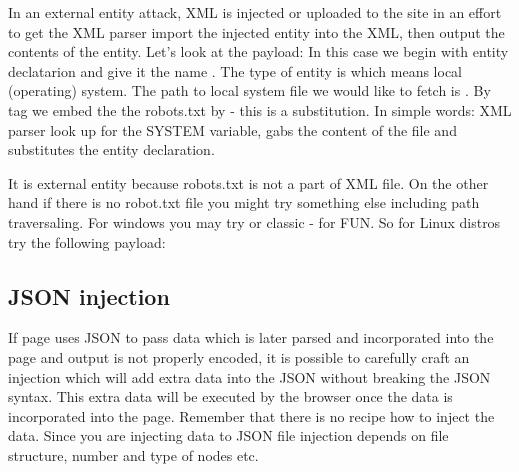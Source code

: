 In an external entity attack, XML is injected or uploaded to the site in an effort to get the XML parser import the injected entity into the XML, then output the contents of the entity.
Let's look at the payload: \newline  {}
In this case we begin with entity declatarion  and give it the name .
The type of entity is  which means local (operating) system.
The path to local system file we would like to fetch is .
By tag  we embed the the robots.txt by  - this is a substitution.
In simple words: XML parser look up for the  SYSTEM variable, gabs the content of the file and substitutes the  entity declaration.


It is external entity because robots.txt is not a part of XML file.
On the other hand if there is no robot.txt file you might try something else including path traversaling.
For windows you may try  or classic  - for FUN.
So for Linux distros try the following payload: \newline


\newpage
\subsection{JSON injection}
If page uses JSON to pass data which is later parsed and incorporated into the page and output is not properly encoded, it is possible to carefully craft an injection which will add extra data into the JSON without breaking the JSON syntax.
This extra data will be executed by the browser once the data is incorporated into the page.
Remember that there is no recipe how to inject the data.
Since you are injecting data to JSON file injection depends on file structure, number and type of nodes etc.
